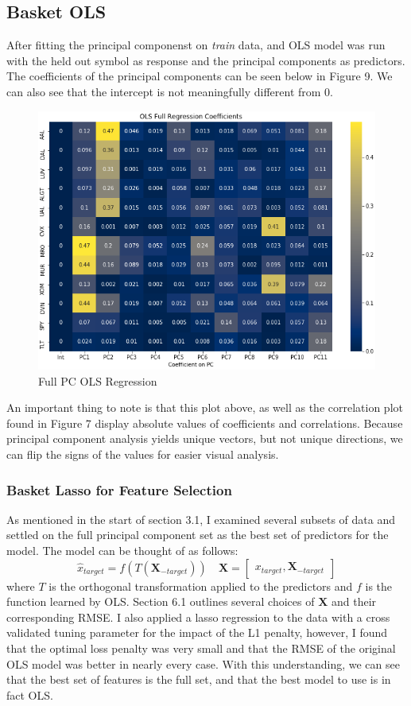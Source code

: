 \documentclass{article}
\begin{document}
\subsection{Basket OLS}
After fitting the principal componenst on \textit{train} data, and OLS model
was run with the held out symbol as response and the principal components as 
predictors. The coefficients of the principal components can be seen below in
Figure 9. We can also see that the intercept is not meaningfully different from 0.
\begin{figure}[h!]
  \centering
  \includegraphics[width=.6\linewidth]{../Figures/Full_PCReg_coef.png}
  \caption{Full PC OLS Regression}
\end{figure}
An important thing to note is that this plot above, as well as the correlation plot
found in Figure 7 display absolute values of coefficients and correlations. Because
principal component analysis yields unique vectors, but not unique directions,
we can flip the signs of the values for easier visual analysis.
\subsubsection{Basket Lasso for Feature Selection}
As mentioned in the start of section 3.1, I examined several subsets of data and 
settled on the full principal component set as the best set of predictors for the model.
The model can be thought of as follows:
$$\hat x_{target} = f(T(\mathbf{X}_{-target}))
\quad
\mathbf{X} = \begin{bmatrix}x_{target}, \mathbf{X}_{-target}\end{bmatrix}
$$
where $T$ is the orthogonal transformation applied to the predictors and
$f$ is the function learned by OLS. Section 6.1
outlines several choices of $\mathbf{X}$ and their corresponding RMSE. I also applied
a lasso regression to the data with a cross validated tuning parameter for 
the impact of the L1 penalty, however, I found that the optimal loss penalty 
was very small and that the RMSE of the original OLS model was better in 
nearly every case. With this understanding, we can see that the best set
of features is the full set, and that the best model to use is in fact OLS.
\end{document}
